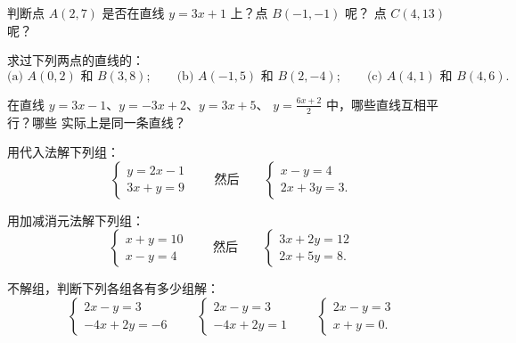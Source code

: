 \begin{exercise}[$\star$]\label{exo:g10:lines:2}
判断点 $A(2, 7)$ 是否在直线 $y = 3x + 1$ 上？点 $B(-1, -1)$ 呢？
点 $C(4, 13)$ 呢？
\end{exercise}

\begin{exercise}[$\star$]\label{exo:g10:lines:3}
求过下列两点的直线的：
\[
\text{(a) } A(0, 2) \text{ 和 } B(3, 8);
\qquad
\text{(b) } A(-1, 5) \text{ 和 } B(2, -4);
\qquad
\text{(c) } A(4, 1) \text{ 和 } B(4, 6).
\]
\end{exercise}

\begin{exercise}[$\star$]\label{exo:g10:lines:4}
在直线 $y = 3x - 1$、$y = -3x + 2$、$y = 3x + 5$、
$y = \frac{6x + 2}{2}$ 中，哪些直线互相平行？哪些
实际上是同一条直线？
\end{exercise}

\begin{exercise}[$\star$]\label{exo:g10:lines:5}
用代入法解下列组：
\[
\begin{cases}
y = 2x - 1 \\
3x + y = 9
\end{cases}
\qquad\text{然后}\qquad
\begin{cases}
x - y = 4 \\
2x + 3y = 3 .
\end{cases}
\]
\end{exercise}

\begin{exercise}[$\star$]\label{exo:g10:lines:6}
用加减消元法解下列组：
\[
\begin{cases}
x + y = 10 \\
x - y = 4
\end{cases}
\qquad\text{然后}\qquad
\begin{cases}
3x + 2y = 12 \\
2x + 5y = 8 .
\end{cases}
\]
\end{exercise}

\begin{exercise}[$\star\star$]\label{exo:g10:lines:7}
不解组，判断下列各组各有多少组解：
\[
\begin{cases}
2x - y = 3 \\
-4x + 2y = -6
\end{cases}
\qquad
\begin{cases}
2x - y = 3 \\
-4x + 2y = 1
\end{cases}
\qquad
\begin{cases}
2x - y = 3 \\
x + y = 0 .
\end{cases}
\]
\end{exercise}

